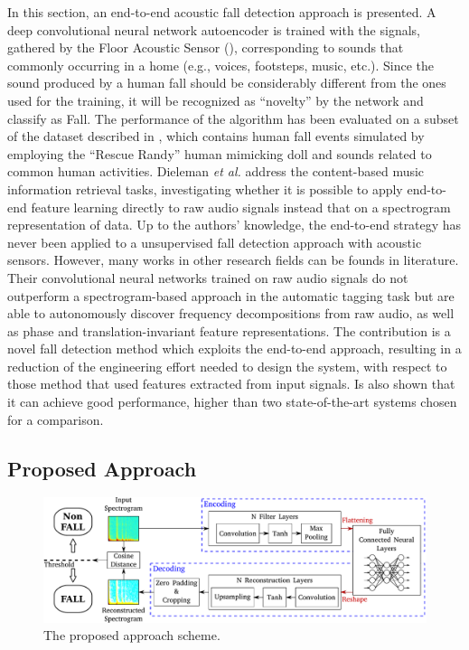 In this section, an end-to-end acoustic fall detection approach is presented. A deep convolutional neural network autoencoder is trained with the signals, gathered by the Floor Acoustic Sensor (), corresponding to sounds that commonly occurring in a home (e.g., voices, footsteps, music, etc.). Since the sound produced by a human fall should be considerably different from the ones used for the training, it will be recognized as ``novelty'' by the network and classify as Fall. 
The performance of the algorithm has been evaluated on a subset of the dataset described in , which contains human fall events simulated by employing the “Rescue Randy” human mimicking doll \cite{Werner2011,zigel2009method,alwan2006smart} and sounds related to common human activities.
Dieleman \textit{et al.} \cite{dieleman2014end} address the content-based music information retrieval tasks, investigating whether it is possible to apply end-to-end feature learning directly to raw audio signals instead that on a spectrogram representation of data.   
Up to the authors' knowledge, the end-to-end strategy has never been applied to a unsupervised fall detection approach with acoustic sensors. However, many works in other research fields can be founds in literature. 
Their convolutional neural networks trained on raw audio signals do not outperform a spectrogram-based approach in the automatic tagging task but are able to autonomously discover frequency decompositions from raw audio, as well as phase and translation-invariant feature representations.
The contribution is a novel fall detection method which exploits the end-to-end approach, resulting in a reduction of the engineering effort needed to design the system, with respect to those method that used features extracted from input signals. Is also shown that it can achieve good performance, higher than two state-of-the-art systems chosen for a comparison.


\subsection{Proposed Approach}
\label{sec:proposedApproach}

\begin{figure}[htb]
	\centering
	\includegraphics[width=\columnwidth]{img/wirn2017/approccioComplessivo.pdf}
	\caption{The proposed approach scheme.}\label{fig:overall}
\end{figure}

